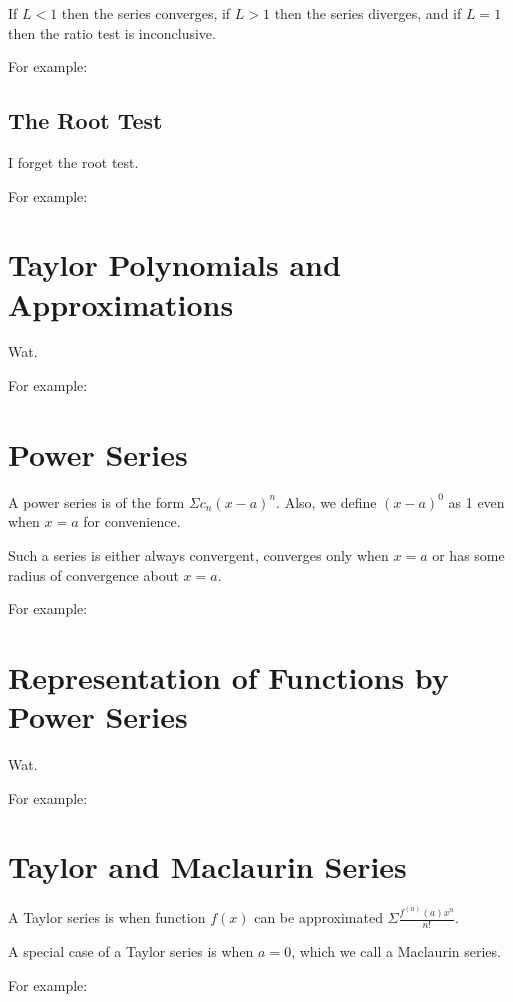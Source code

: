 \documentclass{article}
\begin{document}
If $L<1$ then the series converges, if $L>1$ then the series diverges,
and if $L=1$ then the ratio test is inconclusive.

For example:

\subsection{The Root Test}

I forget the root test.

For example:

\section{Taylor Polynomials and Approximations}

Wat.

For example:

\section{Power Series}

A power series is of the form $\Sigma c_n(x-a)^n$.  Also, we define $(x-a)^0$ as 1 even when $x=a$ for convenience.

Such a series is either always convergent, converges only when $x=a$ or has some radius of convergence about $x=a$.

For example:

\section{Representation of Functions by Power Series}

Wat.

For example:

\section{Taylor and Maclaurin Series}

A Taylor series is when function $f(x)$ can be approximated $\Sigma \frac{f^{(n)}(a)x^n}{n!}$.

A special case of a Taylor series is when $a=0$, which we call a Maclaurin series.

For example:
\end{document}
